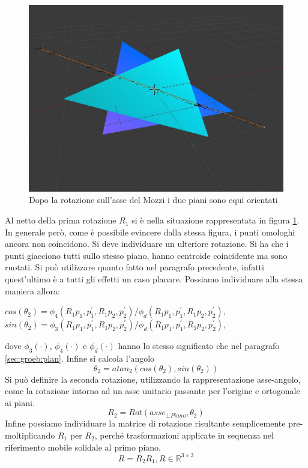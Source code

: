\begin{figure}[h]
	\centering
	\includegraphics[width=420pt]{imgs/PianiSuStessoPiano.jpg}
	\caption{Dopo la rotazione sull'asse del Mozzi i due piani sono equi orientati}
	\label{rot:gb:samePlane}
\end{figure}

Al netto della prima rotazione $R_1$ si è nella situazione rappresentata in figura \ref{rot:gb:samePlane}. In generale però, come è possibile evincere dalla stessa figura, i punti omologhi ancora non coincidono. Si deve individuare un ulteriore rotazione.
Si ha che i punti giacciono tutti sullo stesso piano, hanno centroide coincidente ma sono ruotati. Si può utilizzare quanto fatto nel paragrafo precedente, infatti quest'ultimo è a tutti gli effetti un caso planare.
Possiamo individuare alla stessa maniera allora:
\begin{center}
	$cos(\theta_2) = \phi_4(R_1p_1, p_1^{'}, R_1p_2, p_2^{'})/\phi_d(R_1p_1, p_1^{'}, R_1p_2, p_2^{'}), \,\,$\\
	$sin(\theta_2) = \phi_3(R_1p_1, p_1^{'}, R_1p_2, p_2^{'})/\phi_d(R_1p_1, p_1^{'}, R_1p_2, p_2^{'}),$
\end{center} 
dove $\phi_3(\cdot)$, $\phi_4(\cdot)$ e $\phi_d(\cdot)$ hanno lo stesso significato che nel paragrafo \ref{sec:groeb:plan}. Infine si calcola l'angolo
\begin{equation}
	\theta_2 = atan_2(cos(\theta_2), sin(\theta_2))
\end{equation} 
Si può definire la seconda rotazione, utilizzando la rappresentazione asse-angolo, come la rotazione intorno ad un asse unitario passante per l'origine e ortogonale ai piani.
\begin{equation}
R_2 = Rot(asse_{\bot Piano}, \theta_2)
\end{equation} 
Infine possiamo individuare la matrice di rotazione risultante semplicemente pre-moltiplicando $R_1$ per $R_2$, perché trasformazioni applicate in sequenza nel riferimento mobile solidale al primo piano.
\begin{equation}
	R = R_2R_1, R \in \mathbb{R}^{3 \times 3}
\end{equation}

